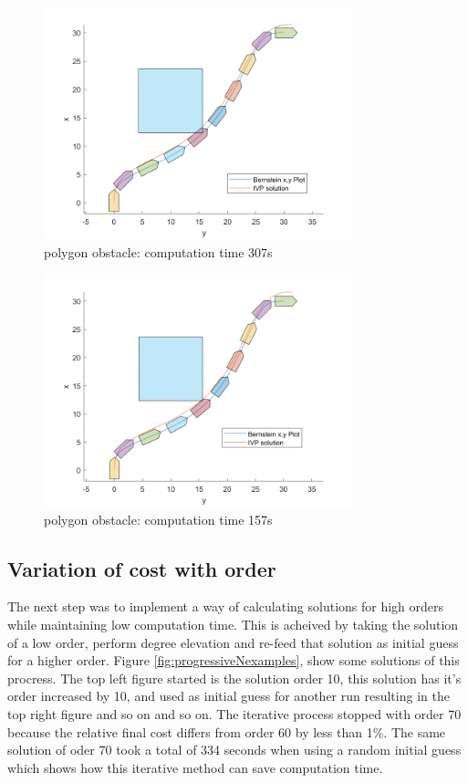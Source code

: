 \begin{figure}[h!]
\centering
\includegraphics[width=0.8\textwidth]{Images/results/polygonobstacle.png}
\caption{polygon obstacle: computation time 307s}
\label{fig:polygonobstacle}
\end{figure}

\begin{figure}[h!]
\centering
\includegraphics[width=0.8\textwidth]{Images/results/polygonobstaclelogbar.png}
\caption{polygon obstacle: computation time 157s}
\label{fig:polygonobstaclelogbar}
\end{figure}


\subsection{Variation of cost with order}

\par The next step was to implement a way of calculating solutions for high orders while maintaining low computation time. This is acheived by taking the solution of a low order, perform degree elevation and re-feed that solution as initial guess for a higher order. Figure \ref{fig:progressiveNexamples}, show some solutions of this procress. The top left figure started is the solution order 10, this solution has it's order increased by 10, and used as initial guess for another run resulting in the top right figure and so on and so on. The iterative process stopped with order 70 because the relative final cost differs from order 60 by less than 1\%. The same solution of oder 70 took a total of 334 seconds when using a random initial guess which shows how this iterative method can save computation time.

